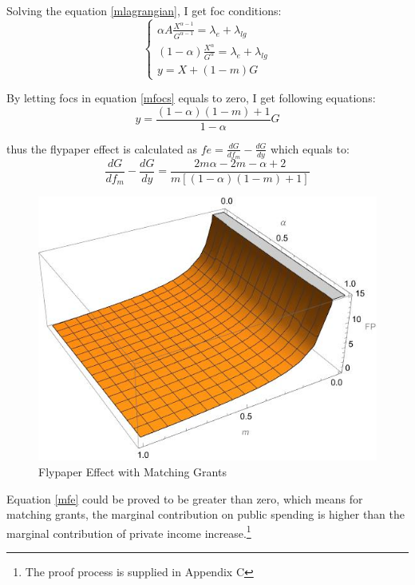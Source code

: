 Solving the equation \ref{mlagrangian}, I get foc conditions:
\begin{equation} \label{mfocs}
    \left\{\begin{array}{l}\alpha A \frac{X^{\alpha-1}}{G^{\alpha-1}}=\lambda_e+\lambda_{l g} \\ (1-\alpha) \frac{X^\alpha}{G^\alpha}=\lambda_e+\lambda_{l g} \\ y=X+(1-m) G\end{array}\right.
\end{equation}

By letting focs in equation \ref{mfocs} equals to zero, I get following equations:
\begin{equation} \label{myxandg}
    y=\frac{(1-\alpha)(1-m)+1}{1-\alpha} G
\end{equation}

thus the flypaper effect is calculated as $fe=\frac{d G}{d f_m}-\frac{d G}{d y}$
which equals to:
\begin{equation} \label{mfe}
    \frac{d G}{d f_m}-\frac{d G}{d y}=\frac{2 m \alpha-2 m-\alpha+2}{m[(1-\alpha)(1-m)+1]}
\end{equation}

\begin{figure}[H]
    \centering
    \includegraphics[scale=0.7]{Chapter-3/Figures/matchfp.jpg}
    \caption[Flypaper Effect with Matching Grants]{Flypaper Effect with Matching Grants
        \texttt{} }
    \label{Figure 3.2}
\end{figure}
Equation \ref*{mfe} could be proved to be greater than zero, which means for matching grants, the marginal contribution on public spending is higher than the marginal contribution of private income increase.\footnote[1]{The proof process is supplied in Appendix C}



